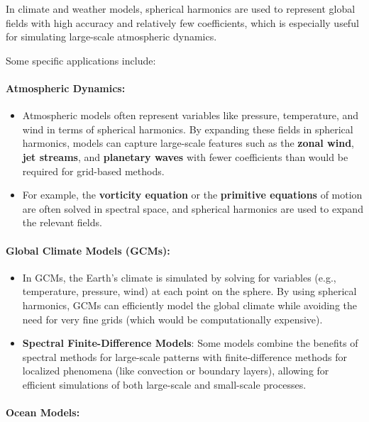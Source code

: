 In climate and weather models, spherical harmonics are used to represent global fields with high accuracy and relatively few coefficients, which is especially useful for simulating large-scale atmospheric dynamics.

Some specific applications include:

\paragraph{\textbf{Atmospheric Dynamics}:}

\begin{itemize}
	\item Atmospheric models often represent variables like pressure, temperature, and wind in terms of spherical harmonics. By expanding these fields in spherical harmonics, models can capture large-scale features such as the \textbf{zonal wind}, \textbf{jet streams}, and \textbf{planetary waves} with fewer coefficients than would be required for grid-based methods.
	\item For example, the \textbf{vorticity equation} or the \textbf{primitive equations} of motion are often solved in spectral space, and spherical harmonics are used to expand the relevant fields.
\end{itemize}

\paragraph{\textbf{Global Climate Models (GCMs)}:}

\begin{itemize}
	\item In GCMs, the Earth's climate is simulated by solving for variables (e.g., temperature, pressure, wind) at each point on the sphere. By using spherical harmonics, GCMs can efficiently model the global climate while avoiding the need for very fine grids (which would be computationally expensive).
	\item \textbf{Spectral Finite-Difference Models}: Some models combine the benefits of spectral methods for large-scale patterns with finite-difference methods for localized phenomena (like convection or boundary layers), allowing for efficient simulations of both large-scale and small-scale processes.
\end{itemize}

\paragraph{\textbf{Ocean Models}:}

